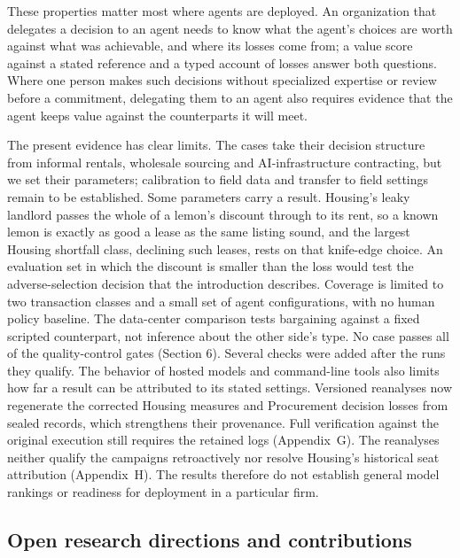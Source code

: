 These properties matter most where agents are deployed. An organization
that delegates a decision to an agent needs to know what the agent's
choices are worth against what was achievable, and where its losses come
from; a value score against a stated reference and a typed account of
losses answer both questions. Where one person makes such decisions
without specialized expertise or review before a commitment, delegating
them to an agent also requires evidence that the agent keeps value against
the counterparts it will meet.

The present evidence has clear limits. The cases take their decision
structure from informal rentals, wholesale sourcing and AI-infrastructure
contracting, but we set their parameters; calibration to
field data and transfer to field settings remain to be established.
Some parameters carry a result. Housing's leaky landlord passes the whole of a
lemon's discount through to its rent, so a known lemon is exactly as good a
lease as the same listing sound, and the largest Housing shortfall class,
declining such leases, rests on that knife-edge choice. An evaluation set in
which the discount is smaller than the loss would test the adverse-selection
decision that the introduction describes.
Coverage is limited to two transaction classes and a small set of agent
configurations, with no human policy baseline. The data-center comparison tests bargaining
against a fixed scripted counterpart, not inference about the other side's type. No case passes all of the
quality-control gates (Section 6). Several checks were added after the runs
they qualify. The behavior of hosted models and command-line tools also limits
how far a result can be attributed to its stated settings.
Versioned reanalyses now regenerate the corrected Housing measures and
Procurement decision losses from sealed records, which strengthens their
provenance. Full verification against the original execution still
requires the retained logs (Appendix~G). The reanalyses neither qualify the
campaigns retroactively nor resolve Housing's historical seat attribution
(Appendix~H). The results therefore do not establish general model rankings
or readiness for deployment in a particular firm.

\subsection{Open research directions and contributions}
\label{sec:open-directions}

